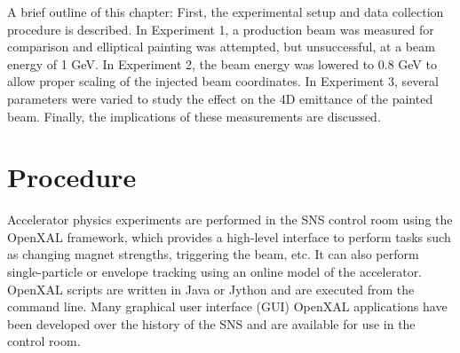 A brief outline of this chapter: First, the experimental setup and data collection procedure is described. In Experiment 1, a production beam was measured for comparison and elliptical painting was attempted, but unsuccessful, at a beam energy of 1 GeV. In Experiment 2, the beam energy was lowered to 0.8 GeV to allow proper scaling of the injected beam coordinates. In Experiment 3, several parameters were varied to study the effect on the 4D emittance of the painted beam. Finally, the implications of these measurements are discussed.


\section{Procedure}

Accelerator physics experiments are performed in the SNS control room using the OpenXAL framework, which provides a high-level interface to perform tasks such as changing magnet strengths, triggering the beam, etc. It can also perform single-particle or envelope tracking using an online model of the accelerator. OpenXAL scripts are written in Java or Jython and are executed from the command line. Many graphical user interface (GUI) OpenXAL applications have been developed over the history of the SNS and are available for use in the control room. 

